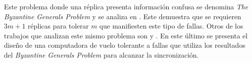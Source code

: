 



Este problema donde una réplica presenta información confusa se denomina \textit{The Byzantine Generals Problem} y se analiza en \cite{lamport2019byzantine}. Este demuestra que se requieren $3 m + 1$ réplicas para tolerar $m$ que manifiesten este tipo de fallas. Otros de los trabajos que analizan este mismo problema son \cite{pease1980reaching} y \cite{wensley1978sift}. En este último se presenta el diseño de una computadora de vuelo tolerante a fallas que utiliza los resultados del \textit{Byzantine Generals Problem} para alcanzar la sincronización.

